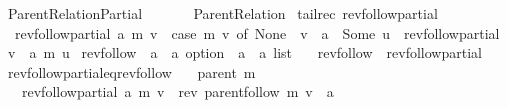 %
\begin{isabellebody}%
%
%
\isadelimtheory
%
\endisadelimtheory
%
\isatagtheory
{}\isamarkupfalse%
\ Parent{\isacharunderscore}{\kern0pt}Relation{\isacharunderscore}{\kern0pt}Partial\isanewline
\ \ \isanewline
\ \ \ \ Parent{\isacharunderscore}{\kern0pt}Relation\isanewline
{}%
\endisatagtheory
{\isafoldtheory}%
%
\isadelimtheory
\isanewline
%
\endisadelimtheory
\isanewline
{}\isamarkupfalse%
\ {\isacharparenleft}{\kern0pt}tailrec{\isacharparenright}{\kern0pt}\ rev{\isacharunderscore}{\kern0pt}follow{\isacharunderscore}{\kern0pt}partial\ \isanewline
\ \ {\isachardoublequoteopen}rev{\isacharunderscore}{\kern0pt}follow{\isacharunderscore}{\kern0pt}partial\ a\ m\ v\ {\isacharequal}{\kern0pt}\ {\isacharparenleft}{\kern0pt}case\ m\ v\ of\ None\ {\isasymRightarrow}\ v\ {\isacharhash}{\kern0pt}\ a\ {\isacharbar}{\kern0pt}\ Some\ u\ {\isasymRightarrow}\ rev{\isacharunderscore}{\kern0pt}follow{\isacharunderscore}{\kern0pt}partial\ {\isacharparenleft}{\kern0pt}v\ {\isacharhash}{\kern0pt}\ a{\isacharparenright}{\kern0pt}\ m\ u{\isacharparenright}{\kern0pt}{\isachardoublequoteclose}\isanewline
\isanewline
{}\isamarkupfalse%
\ rev{\isacharunderscore}{\kern0pt}follow\ {\isacharcolon}{\kern0pt}{\isacharcolon}{\kern0pt}\ {\isachardoublequoteopen}{\isacharparenleft}{\kern0pt}{\isacharprime}{\kern0pt}a\ {\isasymRightarrow}\ {\isacharprime}{\kern0pt}a\ option{\isacharparenright}{\kern0pt}\ {\isasymRightarrow}\ {\isacharprime}{\kern0pt}a\ {\isasymRightarrow}\ {\isacharprime}{\kern0pt}a\ list{\isachardoublequoteclose}\ \isanewline
\ \ {\isachardoublequoteopen}rev{\isacharunderscore}{\kern0pt}follow\ {\isasymequiv}\ rev{\isacharunderscore}{\kern0pt}follow{\isacharunderscore}{\kern0pt}partial\ {\isacharbrackleft}{\kern0pt}{\isacharbrackright}{\kern0pt}{\isachardoublequoteclose}\isanewline
\isanewline
{}\isamarkupfalse%
\ rev{\isacharunderscore}{\kern0pt}follow{\isacharunderscore}{\kern0pt}partial{\isacharunderscore}{\kern0pt}eq{\isacharunderscore}{\kern0pt}rev{\isacharunderscore}{\kern0pt}follow{\isacharcolon}{\kern0pt}\isanewline
\ \ \ {\isachardoublequoteopen}parent\ m{\isachardoublequoteclose}\isanewline
\ \ \ {\isachardoublequoteopen}rev{\isacharunderscore}{\kern0pt}follow{\isacharunderscore}{\kern0pt}partial\ a\ m\ v\ {\isacharequal}{\kern0pt}\ rev\ {\isacharparenleft}{\kern0pt}parent{\isachardot}{\kern0pt}follow\ m\ v{\isacharparenright}{\kern0pt}\ {\isacharat}{\kern0pt}\ a{\isachardoublequoteclose}\isanewline

\end{isabellebody}
